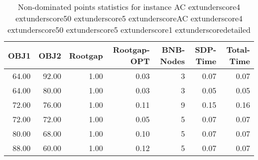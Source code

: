 \begin{table}
\caption{Non-dominated points statistics for instance AC	extunderscore4	extunderscore50	extunderscore5	extunderscoreAC	extunderscore4	extunderscore50	extunderscore5	extunderscore1	extunderscoredetailed}
\label{tab:stats/AC_4_50_5_AC_4_50_5_1_detailed}
\begin{tabular}{rrrrrrr}
\toprule
OBJ1 & OBJ2 & Rootgap & Rootgap-OPT & BNB-Nodes & SDP-Time & Total-Time \\
\midrule
64.00 & 92.00 & 1.00 & 0.03 & 3 & 0.07 & 0.07 \\
64.00 & 80.00 & 1.00 & 0.03 & 3 & 0.05 & 0.05 \\
72.00 & 76.00 & 1.00 & 0.11 & 9 & 0.15 & 0.16 \\
72.00 & 72.00 & 1.00 & 0.05 & 5 & 0.07 & 0.07 \\
80.00 & 68.00 & 1.00 & 0.10 & 5 & 0.07 & 0.07 \\
88.00 & 60.00 & 1.00 & 0.12 & 5 & 0.07 & 0.07 \\
\bottomrule
\end{tabular}
\end{table}
